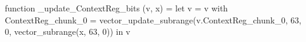 function _update_ContextReg_bits (v, x) = let v = { v with ContextReg_chunk_0 = vector_update_subrange(v.ContextReg_chunk_0, 63, 0, vector_subrange(x, 63, 0)) } in v

